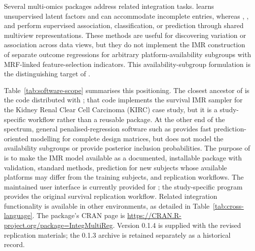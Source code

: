 \documentclass[article]{jss}
\begin{document}
Several multi-omics packages address related integration tasks. 
\citep{argelaguet2018} learns unsupervised latent factors and can accommodate
incomplete entries, whereas  \citep{chekouo2023bipnet},
 \citep{safo2022sida}, and 
\citep{safo2025rand} perform supervised association, classification, or
prediction through shared multiview representations. These methods are useful
for discovering variation or association across data views, but they do not
implement the IMR construction of separate outcome regressions for arbitrary
platform-availability subgroups with MRF-linked feature-selection indicators.
This availability-subgroup formulation is the distinguishing target of
.

Table~\ref{tab:software-scope} summarises this positioning.  The closest
ancestor of  is the  code distributed with
\citet{chekouo2017}; that code implements the survival IMR sampler for the
Kidney Renal Clear Cell Carcinoma (KIRC) case study, but it is a study-specific
workflow rather than a reusable  package.  At the other end of the
spectrum, general penalised-regression software such as 
\citep{friedman2010} provides fast prediction-oriented modelling for complete
design matrices, but does not model the availability subgroups or provide
posterior inclusion probabilities.  The purpose of  is to
make the IMR model available as a documented, installable package with
validation, standard  methods, prediction for new subjects whose
available platforms may differ from the training subjects, and replication
workflows.  The maintained user interface is currently provided for
; the study-specific  program provides the original survival
replication workflow. Related integration functionality is available in other
environments, as detailed in Table~\ref{tab:cross-language}. The package's CRAN page is
\url{https://CRAN.R-project.org/package=IntegMultiReg}.
Version 0.1.4 is supplied with the revised replication materials; the 0.1.3
archive is retained separately as a historical record.
\end{document}
